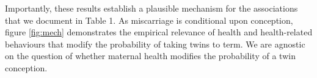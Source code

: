 \documentclass{nature}
\begin{document}
\begin{linenumbers}
Importantly, these results establish a plausible mechanism for the associations that we document in Table 1. %
As miscarriage is conditional upon conception, figure \ref{fig:mech} demonstrates the empirical relevance of health and health-related behaviours that modify the probability of taking twins to term. %
We are agnostic on the question of whether maternal health modifies the probability of a twin conception.



\end{linenumbers}
\end{document}
